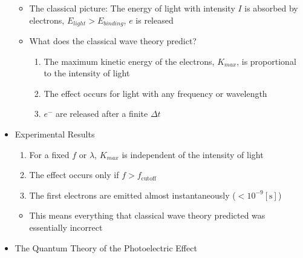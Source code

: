 \begin{itemize}
    \begin{itemize}

      \item The classical picture: The energy of light with intensity $I$ is absorbed by electrons, $E_{light} > E_{binding}$, $e$ is released


      \item What does the classical wave theory predict?

        \begin{enumerate}

          \item The maximum kinetic energy of the electrons, $K_{max}$, is proportional to the intensity of light

          \item The effect occurs for light with any frequency or wavelength

          \item $e^-$ are released after a finite $\Delta t$

        \end{enumerate}

    \end{itemize}

  \item Experimental Results

    \begin{enumerate}

      \item For a fixed $f$ or $\lambda$, $K_{max}$ is independent of the intensity of light

      \item The effect occurs only if $f>f_{\text{cutoff}}$

      \item The first electrons are emitted almost instantaneously ($<10^{-9}[\si{\second}]$)

    \end{enumerate}

    \begin{itemize}

      \item This means everything that classical wave theory predicted was essentially incorrect

    \end{itemize}

  \item The Quantum Theory of the Photoelectric Effect

    \begin{itemize}


\end{itemize}
\end{itemize}
